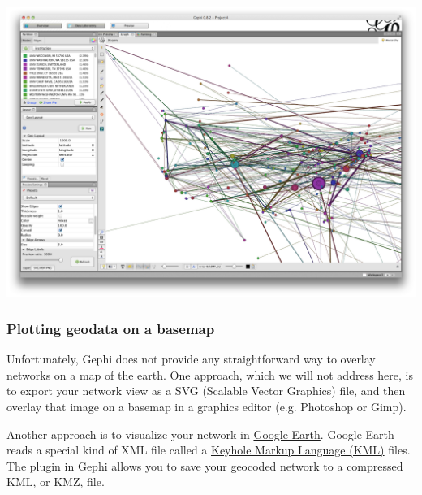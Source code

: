 \documentclass[letterpaper,10pt,english]{sphinxmanual}
\begin{document}
{\hfill\includegraphics{geo9.png}\hfill}


\subsubsection{Plotting geodata on a basemap}
\label{tutorial.geonetworks:plotting-geodata-on-a-basemap}
Unfortunately, Gephi does not provide any straightforward way to overlay networks on a
map of the earth. One approach, which we will not address here, is to export your network
view as a SVG (Scalable Vector Graphics) file, and then overlay that image on a basemap
in a graphics editor (e.g. Photoshop or Gimp).

Another approach is to visualize your network in \href{http://www.google.com/earth/}{Google Earth}. Google Earth reads a special kind of XML file called a
\href{http://en.wikipedia.org/wiki/Keyhole\_Markup\_Language}{Keyhole Markup Language (KML)}
files. The  plugin in Gephi allows you to save your geocoded network to a
compressed KML, or KMZ, file.
\end{document}
